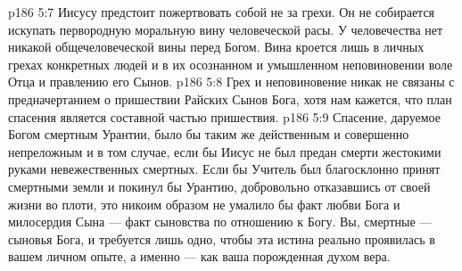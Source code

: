 \vs p186 5:7 Иисусу предстоит пожертвовать собой не за грехи. Он не собирается искупать первородную моральную вину человеческой расы. У человечества нет никакой общечеловеческой вины перед Богом. Вина кроется лишь в личных грехах конкретных людей и в их осознанном и умышленном неповиновении воле Отца и правлению его Сынов.
\vs p186 5:8 Грех и неповиновение никак не связаны с предначертанием о пришествии Райских Сынов Бога, хотя нам кажется, что план спасения является составной частью пришествия.
\vs p186 5:9 Спасение, даруемое Богом смертным Урантии, было бы таким же действенным и совершенно непреложным и в том случае, если бы Иисус не был предан смерти жестокими руками невежественных смертных. Если бы Учитель был благосклонно принят смертными земли и покинул бы Урантию, добровольно отказавшись от своей жизни во плоти, это никоим образом не умалило бы факт любви Бога и милосердия Сына --- факт сыновства по отношению к Богу. Вы, смертные --- сыновья Бога, и требуется лишь одно, чтобы эта истина реально проявилась в вашем личном опыте, а именно --- как ваша порожденная духом вера.
